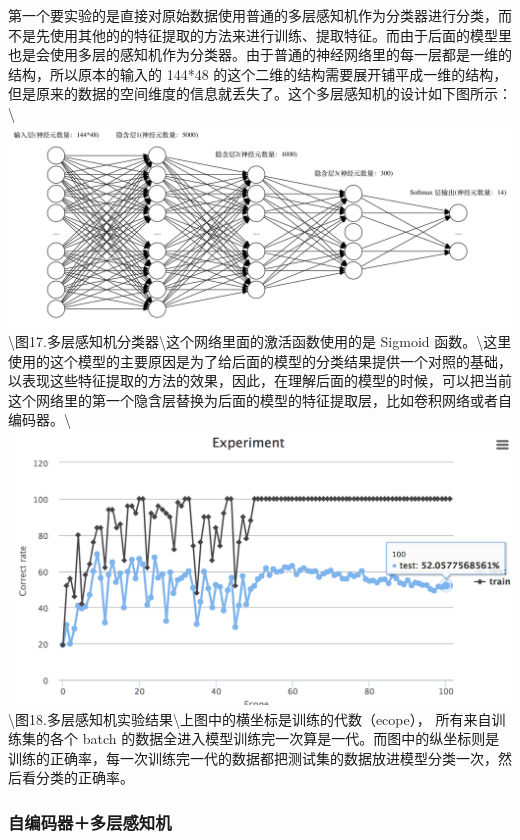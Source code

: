 第一个要实验的是直接对原始数据使用普通的多层感知机作为分类器进行分类，而不是先使用其他的的特征提取的方法来进行训练、提取特征。而由于后面的模型里也是会使用多层的感知机作为分类器。由于普通的神经网络里的每一层都是一维的结构，所以原本的输入的
144*48
的这个二维的结构需要展开铺平成一维的结构，但是原来的数据的空间维度的信息就丢失了。这个多层感知机的设计如下图所示：\textbackslash{}\includegraphics{picture/5l-mlp.png}\textbackslash{}图17.多层感知机分类器\textbackslash{}这个网络里面的激活函数使用的是
Sigmoid
函数。\textbackslash{}这里使用的这个模型的主要原因是为了给后面的模型的分类结果提供一个对照的基础，以表现这些特征提取的方法的效果，因此，在理解后面的模型的时候，可以把当前这个网络里的第一个隐含层替换为后面的模型的特征提取层，比如卷积网络或者自编码器。\textbackslash{}\includegraphics{picture/5l-mlp-experiment.png}\textbackslash{}图18.多层感知机实验结果\textbackslash{}上图中的横坐标是训练的代数（ecope），
所有来自训练集的各个 batch
的数据全进入模型训练完一次算是一代。而图中的纵坐标则是训练的正确率，每一次训练完一代的数据都把测试集的数据放进模型分类一次，然后看分类的正确率。

\subsubsection{自编码器＋多层感知机}\label{ux81eaux7f16ux7801ux5668ux591aux5c42ux611fux77e5ux673a}

